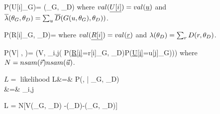\beq\color{blue}
P(U[i]\mid \theta_G)=
{\ol{\lam}(\theta_G, \theta_D)}
\eeq
where  $val(\ul{U[i]})=val(\rvu)$ and $\overline{\lambda}(\theta_G, \theta_D)
=\sum_u\overline{D}
(G
(u, \theta_G), \theta_D))$.

\beq\color{blue}
P(R[i]\mid \theta_G, \theta_D)= 
\eeq
where $val(\ul{R[i]})=val(\rvr)$ and  $\lambda(\theta_D)=\sum_r D(r, \theta_D)$.


\beq\color{blue}
P(V| \vecu,  \vecr)=
\delta(V, \ln \prod_{i,j}(
P(\ul{R[i]}=r[i]\mid \theta_G, \theta_D)P(\ul{U[i]}=u[j]\mid \theta_G)))
\eeq
where $N=nsam({\vec{r}})nsam({\vec{u}})$.


$ L=$ likelihood
\beqa
 L&=&
P(\vecr, \vecu| \theta_G, \theta_D)\\
&=&
\prod_{i,j}
\eeqa

\beq
\ln  L = N[V(\theta_G, \theta_D)
-\ln \lam(\theta_D)-\ln \ol{\lam}(\theta_G, \theta_D)]
\eeq



